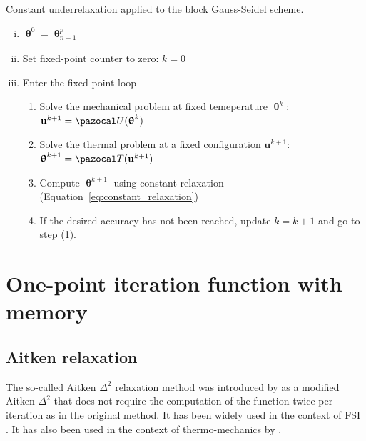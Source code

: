 \begin{framedbox}[htb]
  \caption{Constant underrelaxation applied to the block Gauss-Seidel scheme.}
  \label{box:constant_underrelaxation}
  \begin{center}
    \begin{minipage}{0.9\textwidth}
    \begin{enumerate}[(i)]
    \item \(\bm\uptheta^0 = \bm\uptheta_{n+1}^p\)
    \item Set fixed-point counter to zero: \(k=0\)
    \item Enter the fixed-point loop
    \begin{enumerate}[(1)]
      \item Solve the mechanical problem at fixed temeperature \(\bm \uptheta^k\): \(\mathbf u^{k+1} = \pazocal U(\bm \uptheta^k)\)
      \item Solve the thermal problem at a fixed configuration \(\mathbf u^{k+1}\): \(\bm \uptheta^{k+1} = \pazocal T(\mathbf u^{k+1})\)
      \item Compute \(\bm \uptheta^{k+1}\) using constant relaxation (Equation~\eqref{eq:constant_relaxation})
      \item If the desired accuracy has not been reached, update \(k=k+1\) and go to step (1).
    \end{enumerate}
    \end{enumerate}
    \end{minipage}
  \end{center}
\end{framedbox}

\section{One-point iteration function with memory}

\subsection{Aitken relaxation} \label{sec:aitken_relaxation}


The so-called Aitken \(\Delta^2\) relaxation method was introduced by \cite{irons_version_1969} as a modified Aitken \(\Delta^2\) that does not require the computation of the function twice per iteration as in the original method.
It has been widely used in the context of FSI \citep{irons_version_1969, kuttler_fixed-point_2008, joosten_analysis_2009, kuttler_vector_2009, erbts_partitioned_2015, wendt_partitioned_2015}.
It has also been used in the context of thermo-mechanics by \cite{danowski_monolithic_2013}.

